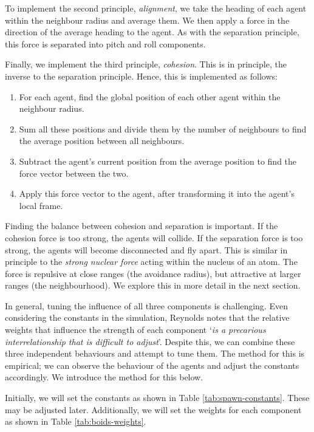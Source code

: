 \documentclass{article}
\begin{document}
To implement the second principle, \emph{alignment}, we take the heading of each agent within the neighbour radius and average them. We then apply a force in the direction of the average heading to the agent. As with the separation principle, this force is separated into pitch and roll components.

Finally, we implement the third principle, \emph{cohesion}. This is in principle, the inverse to the separation principle. Hence, this is implemented as follows:

\begin{enumerate}
    \item For each agent, find the global position of each other agent within the neighbour radius.
    \item Sum all these positions and divide them by the number of neighbours to find the average position between all neighbours.
    \item Subtract the agent's current position from the average position to find the force vector between the two.
    \item Apply this force vector to the agent, after transforming it into the agent's local frame.
\end{enumerate}

Finding the balance between cohesion and separation is important. If the cohesion force is too strong, the agents will collide. If the separation force is too strong, the agents will become disconnected and fly apart. This is similar in principle to the \emph{strong nuclear force} acting within the nucleus of an atom. The force is repulsive at close ranges (the avoidance radius), but attractive at larger ranges (the neighbourhood). We explore this in more detail in the next section.

In general, tuning the influence of all three components is challenging. Even considering the constants in the simulation, Reynolds notes that the relative weights that influence the strength of each component `\emph{is a precarious interrelationship that is difficult to adjust}'. Despite this, we can combine these three independent behaviours and attempt to tune them. The method for this is empirical; we can observe the behaviour of the agents and adjust the constants accordingly. We introduce the method for this below.

Initially, we will set the constants as shown in Table \ref{tab:spawn-constants}. These may be adjusted later. Additionally, we will set the weights for each component as shown in Table \ref{tab:boids-weights}.
\end{document}

